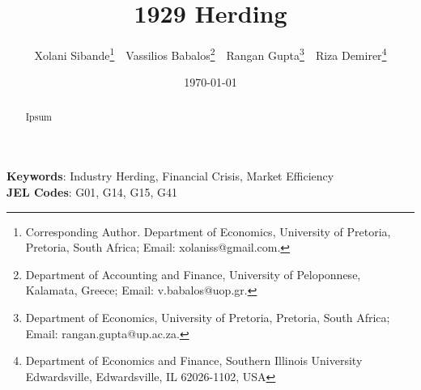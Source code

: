 
\title{1929 Herding}


\author { Xolani Sibande\footnote{Corresponding Author. Department of Economics, University of Pretoria, Pretoria, South Africa; Email: xolaniss@gmail.com.} \,\, 
Vassilios Babalos\footnote{Department of Accounting and Finance, University of Peloponnese, Kalamata,  Greece; Email: v.babalos@uop.gr.} \,\,
Rangan Gupta\footnote{ Department of Economics, University of Pretoria, Pretoria, South Africa; Email: rangan.gupta@up.ac.za.} \,\,
Riza Demirer\footnote{Department of Economics and Finance, Southern Illinois University Edwardsville, Edwardsville, IL 62026-1102, USA}}
\date{\today}
\maketitle

\begin{abstract}
Ipsum

\end{abstract}

\noindent\textbf{Keywords}: Industry Herding, Financial Crisis, Market Efficiency
\\
\textbf{JEL Codes}: G01, G14, G15, G41
\newpage